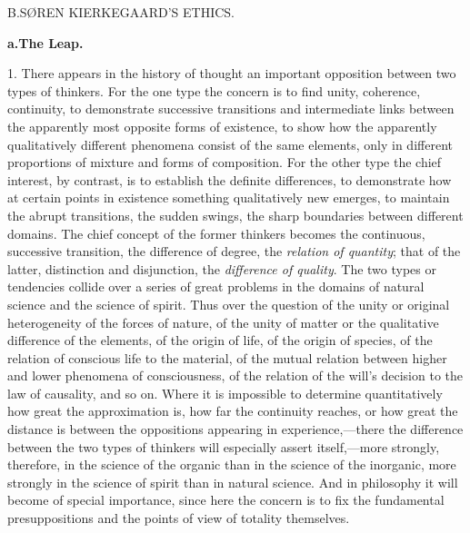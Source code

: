\documentclass[12pt,a4paper]{book}
\newcommand{\opage}[1]{\marginnote{\footnotesize\textit{[#1]}}}
\begin{document}
\begin{center}B.\enspace SØREN KIERKEGAARD'S ETHICS.\end{center}

\begin{center}\textbf{a.\enspace The Leap.}\end{center}

1. There appears in the history of thought an important opposition
between two types of thinkers. For the one type the concern is to find
unity, coherence, continuity, to demonstrate successive transitions and
intermediate links between the apparently most opposite forms of
existence, to show how the apparently qualitatively different phenomena
consist of the same elements, only in different proportions of mixture
and forms of composition. For the other type the chief interest, by
contrast, is to establish the definite differences, to demonstrate how at
certain points in existence something qualitatively new emerges, to
maintain the abrupt transitions, the sudden swings, the sharp boundaries
between different domains. The chief concept of the former thinkers
becomes the continuous, successive transition, the difference of degree,
the \textit{relation of quantity}; that of the latter, distinction and
disjunction, the \textit{difference of quality}. The two types or
tendencies collide over a series of great problems in the domains of
natural science and the science of spirit.
\opage{71}Thus over the question of the unity or original heterogeneity of the
forces of nature, of the unity of matter or the qualitative difference of
the elements, of the origin of life, of the origin of species, of the
relation of conscious life to the material, of the mutual relation
between higher and lower phenomena of consciousness, of the relation of
the will's decision to the law of causality, and so on. Where it is
impossible to determine quantitatively how great the approximation is,
how far the continuity reaches, or how great the distance is between the
oppositions appearing in experience,---there the difference between the
two types of thinkers will especially assert itself,---more strongly,
therefore, in the science of the organic than in the science of the
inorganic, more strongly in the science of spirit than in natural
science. And in philosophy it will become of special importance, since
here the concern is to fix the fundamental presuppositions and the points
of view of totality themselves.
\end{document}
